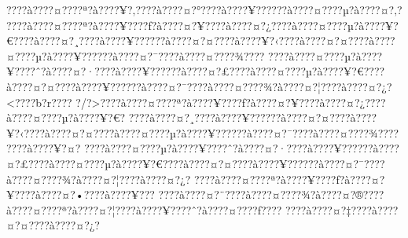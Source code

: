 \documentclass[11pt, openany]{book}
\begin{document}
???\textbar{}?à???\textbar{}?¤???\textbar{}?ª?à???\textbar{}?¥?‚???\textbar{}?à???\textbar{}?¤?°???\textbar{}?à???\textbar{}?¥?????\textbar{}?à???\textbar{}?¤???\textbar{}?µ?à???\textbar{}?¤?‚?
???\textbar{}?à???\textbar{}?¤???\textbar{}?ª?à???\textbar{}?¥???\textbar{}?ƒ?à???\textbar{}?¤?¥???\textbar{}?à???\textbar{}?¤?¿???\textbar{}?à???\textbar{}?¤???\textbar{}?µ?à???\textbar{}?¥?€???\textbar{}?à???\textbar{}?¤?¸???\textbar{}?à???\textbar{}?¥?????\textbar{}?à???\textbar{}?¤?¤???\textbar{}?à???\textbar{}?¥?‹???\textbar{}?à???\textbar{}?¤?¤???\textbar{}?à???\textbar{}?¤???\textbar{}?µ?à???\textbar{}?¥?????\textbar{}?à???\textbar{}?¤?¯???\textbar{}?à???\textbar{}?¤???\textbar{}?¾???\textbar{}?
???\textbar{}?à???\textbar{}?¤???\textbar{}?µ?à???\textbar{}?¥???\textbar{}?ˆ?à???\textbar{}?¤?·???\textbar{}?à???\textbar{}?¥?????\textbar{}?à???\textbar{}?¤?£???\textbar{}?à???\textbar{}?¤???\textbar{}?µ?à???\textbar{}?¥?€???\textbar{}?à???\textbar{}?¤?¤???\textbar{}?à???\textbar{}?¥?????\textbar{}?à???\textbar{}?¤?¯???\textbar{}?à???\textbar{}?¤???\textbar{}?¾?à???\textbar{}?¤?¦???\textbar{}?à???\textbar{}?¤?¿?\textless{}???\textbar{}?b?r???\textbar{}?
?/?\textgreater{}???\textbar{}?à???\textbar{}?¤???\textbar{}?ª?à???\textbar{}?¥???\textbar{}?ƒ?à???\textbar{}?¤?¥???\textbar{}?à???\textbar{}?¤?¿???\textbar{}?à???\textbar{}?¤???\textbar{}?µ?à???\textbar{}?¥?€?
???\textbar{}?à???\textbar{}?¤?¸???\textbar{}?à???\textbar{}?¥?????\textbar{}?à???\textbar{}?¤?¤???\textbar{}?à???\textbar{}?¥?‹???\textbar{}?à???\textbar{}?¤?¤???\textbar{}?à???\textbar{}?¤???\textbar{}?µ?à???\textbar{}?¥?????\textbar{}?à???\textbar{}?¤?¯???\textbar{}?à???\textbar{}?¤???\textbar{}?¾???\textbar{}?
???\textbar{}?à???\textbar{}?¥?¤?
???\textbar{}?à???\textbar{}?¤???\textbar{}?µ?à???\textbar{}?¥???\textbar{}?ˆ?à???\textbar{}?¤?·???\textbar{}?à???\textbar{}?¥?????\textbar{}?à???\textbar{}?¤?£???\textbar{}?à???\textbar{}?¤???\textbar{}?µ?à???\textbar{}?¥?€???\textbar{}?à???\textbar{}?¤?¤???\textbar{}?à???\textbar{}?¥?????\textbar{}?à???\textbar{}?¤?¯???\textbar{}?à???\textbar{}?¤???\textbar{}?¾?à???\textbar{}?¤?¦???\textbar{}?à???\textbar{}?¤?¿?
???\textbar{}?à???\textbar{}?¤???\textbar{}?ª?à???\textbar{}?¥???\textbar{}?ƒ?à???\textbar{}?¤?¥???\textbar{}?à???\textbar{}?¤?•???\textbar{}?à???\textbar{}?¥???
???\textbar{}?à???\textbar{}?¤?¨???\textbar{}?à???\textbar{}?¤???\textbar{}?¾?à???\textbar{}?¤?®???\textbar{}?à???\textbar{}?¤???\textbar{}?ª?à???\textbar{}?¤?¦???\textbar{}?à???\textbar{}?¥???\textbar{}?ˆ?à???\textbar{}?¤???\textbar{}?ƒ???\textbar{}?
???\textbar{}?à???\textbar{}?¤?‡???\textbar{}?à???\textbar{}?¤?¤???\textbar{}?à???\textbar{}?¤?¿?
\end{document}
